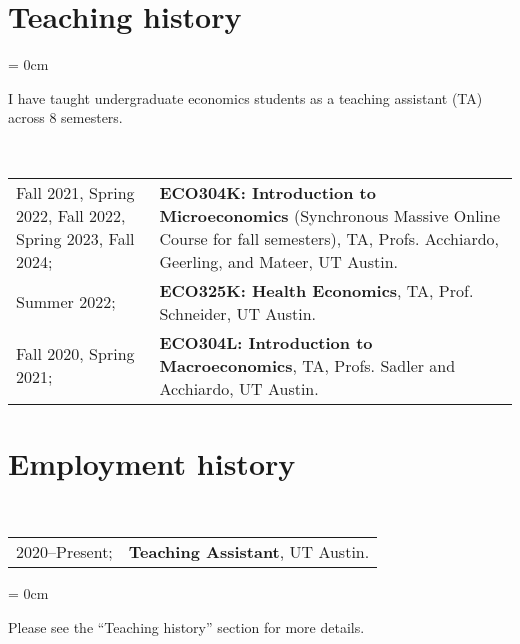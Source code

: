 \documentclass[a4paper, 10pt]{article}
\begin{document}
  \section{Teaching history}
  \begin{compactitem}\parskip = 0cm
    \item I have taught undergraduate economics students as a teaching assistant (TA) across 8 semesters.
  \end{compactitem}
  \vspace*{0.70em}
  ~\begin{tabular}{p{3.5cm} p{12cm}}
    Fall 2021, Spring 2022, Fall 2022, Spring 2023, Fall 2024; & \textbf{ECO304K: Introduction to Microeconomics} (Synchronous Massive Online Course for fall semesters), TA, Profs. Acchiardo, Geerling, and Mateer, UT Austin.\\
    Summer 2022; & \textbf{ECO325K: Health Economics}, TA, Prof. Schneider, UT Austin.\\
    Fall 2020, Spring 2021; & \textbf{ECO304L: Introduction to Macroeconomics}, TA, Profs. Sadler and Acchiardo, UT Austin.\\
  \end{tabular}
  \vspace*{-0.5em}

  \section{Employment history}
  ~\begin{tabular}{ll}
    2020--Present; & \textbf{Teaching Assistant}, UT Austin.
  \end{tabular}
  \begin{compactitem}\parskip = 0cm
    \item Please see the ``Teaching history'' section for more details.
  \end{compactitem}
  \vspace*{1.25em}
\end{document}

